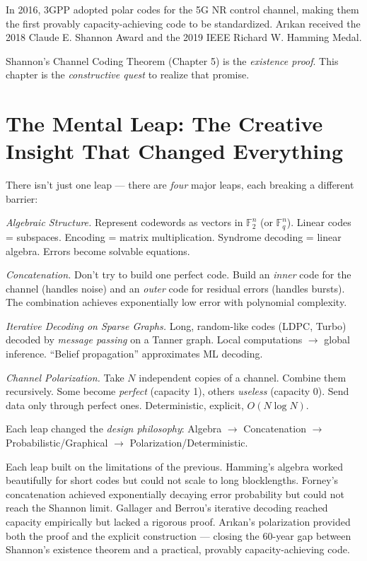 In 2016, 3GPP adopted polar codes for the 5G NR control channel, making them the first provably capacity-achieving code to be standardized. Arıkan received the 2018 Claude E. Shannon Award and the 2019 IEEE Richard W. Hamming Medal.

Shannon's Channel Coding Theorem (Chapter 5) is the \emph{existence proof}. This chapter is the \emph{constructive quest} to realize that promise.

\section{The Mental Leap: The Creative Insight That Changed Everything}
\label{sec:ec:leap}

There isn't just one leap — there are \emph{four} major leaps, each breaking a different barrier:

\emph{Algebraic Structure.} Represent codewords as vectors in $\mathbb{F}_2^n$ (or $\mathbb{F}_q^n$). Linear codes = subspaces. Encoding = matrix multiplication. Syndrome decoding = linear algebra. Errors become solvable equations.

\emph{Concatenation.} Don't try to build one perfect code. Build an \emph{inner} code for the channel (handles noise) and an \emph{outer} code for residual errors (handles bursts). The combination achieves exponentially low error with polynomial complexity.

\emph{Iterative Decoding on Sparse Graphs.} Long, random-like codes (LDPC, Turbo) decoded by \emph{message passing} on a Tanner graph. Local computations $\to$ global inference. ``Belief propagation'' approximates ML decoding.

\emph{Channel Polarization.} Take $N$ independent copies of a channel. Combine them recursively. Some become \emph{perfect} (capacity 1), others \emph{useless} (capacity 0). Send data only through perfect ones. Deterministic, explicit, $O(N \log N)$.

Each leap changed the \emph{design philosophy}: Algebra $\to$ Concatenation $\to$ Probabilistic/Graphical $\to$ Polarization/Deterministic.

Each leap built on the limitations of the previous. Hamming's algebra worked beautifully for short codes but could not scale to long blocklengths. Forney's concatenation achieved exponentially decaying error probability but could not reach the Shannon limit. Gallager and Berrou's iterative decoding reached capacity empirically but lacked a rigorous proof. Arıkan's polarization provided both the proof and the explicit construction — closing the 60-year gap between Shannon's existence theorem and a practical, provably capacity-achieving code.

